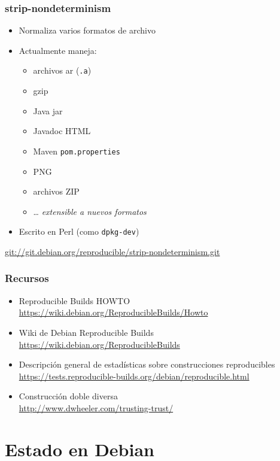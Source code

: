 \documentclass[14pt,aspectratio=169]{beamer}
\begin{document}
\begin{frame}
 \frametitle{strip-nondeterminism}

 \begin{itemize}
  \item Normaliza varios formatos de archivo
  \item Actualmente maneja:
   \begin{itemize}
    \item archivos ar (\texttt{.a})
    \item gzip
    \item Java jar
    \item Javadoc HTML
    \item Maven \texttt{pom.properties}
    \item PNG
    \item archivos ZIP
    \item … \textit{extensible a nuevos formatos}
   \end{itemize}
  \item Escrito en Perl (como \texttt{dpkg-dev})
 \end{itemize}
 \vfill
 \begin{center}\small
  \url{git://git.debian.org/reproducible/strip-nondeterminism.git}
 \end{center}
\end{frame}

\begin{frame}
 \frametitle{Recursos}

 \begin{itemize}
  \item Reproducible Builds HOWTO \\
   \url{https://wiki.debian.org/ReproducibleBuilds/Howto}
  \item<2-> Wiki de Debian Reproducible Builds \\
   \url{https://wiki.debian.org/ReproducibleBuilds}
   \item<2-> Descripción general de estadísticas sobre construcciones reproducibles \\
   \url{https://tests.reproducible-builds.org/debian/reproducible.html}
  \item<3> Construcción doble diversa \\
   \url{http://www.dwheeler.com/trusting-trust/}
 \end{itemize}
\end{frame}

\section{Estado en Debian}
\end{document}
